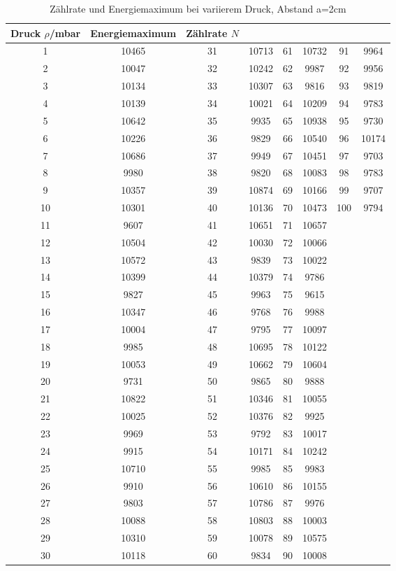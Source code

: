 \begin{table}[H]
  \centering
  \caption{Zählrate und Energiemaximum bei variierem Druck, Abstand a=2cm}
  \label{tab:tab1}
    \begin{tabular}{c c |c c| c c| c c}
    \toprule
    Druck $\rho$/\;mbar & Energiemaximum & Zählrate $N$\\
    \midrule
    1 &10465& 31 &10713 &61& 10732& 91& 9964\\
    2 &10047& 32 &10242 &62 &9987 &92 &9956\\
    3 &10134& 33 &10307 &63 &9816 &93 &9819\\
    4 &10139& 34 &10021& 64 &10209& 94& 9783\\
    5 &10642& 35 &9935 &65 &10938 &95 &9730\\
    6 &10226& 36 &9829 &66& 10540 &96 &10174\\
    7 &10686& 37 &9949 &67 &10451 &97 &9703\\
    8 &9980& 38 &9820 &68 &10083 &98 &9783\\
    9 &10357 &39 &10874 &69& 10166& 99& 9707\\
    10 &10301 &40 &10136 &70& 10473& 100& 9794\\
    11 &9607 &41 &10651 &71 &10657 & & \\
    12 &10504 &42 &10030& 72 &10066 & & \\
    13 &10572 &43 &9839 &73 &10022 & & \\
    14 &10399& 44 &10379& 74 &9786 & & \\
    15 &9827 &45 &9963 &75 &9615 & & \\
    16 &10347 &46 &9768 &76& 9988 & & \\
    17 &10004 &47 &9795& 77 &10097 & & \\
    18 &9985 &48 &10695 &78 &10122 & & \\
    19 &10053 &49 &10662 &79& 10604 & & \\
    20 &9731 &50 &9865   &80 &9888 & & \\
    21 &10822 &51 &10346 &81 &10055 & & \\
    22 &10025 &52 &10376& 82 &9925 & & \\
    23 &9969 &53 &9792   &83 &10017 & & \\
    24 &9915 &54 &10171 &84 &10242 & & \\
    25 &10710& 55 &9985 &85& 9983 & & \\
    26 &9910 &56 &10610 &86 &10155 & & \\
    27 &9803 &57& 10786& 87 &9976 & & \\
    28 &10088 &58& 10803& 88 &10003 & & \\
    29 &10310 &59 &10078& 89 &10575 & & \\
    30 &10118& 60 &9834 &90 &10008 & & \\
    \bottomrule
    \end{tabular}
  \end{table}
